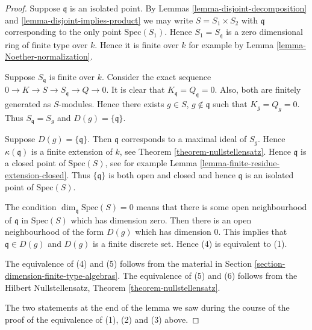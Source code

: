 \begin{proof}
Suppose $\mathfrak q$ is an isolated point.
By Lemmas \ref{lemma-disjoint-decomposition} and
\ref{lemma-disjoint-implies-product} we may
write $S = S_1 \times S_2$ with $\mathfrak q$
corresponding to the only point $\text{Spec}(S_1)$.
Hence $S_1 = S_{\mathfrak q}$ is a zero dimensional
ring of finite type over $k$. Hence it is finite over $k$
for example by Lemma \ref{lemma-Noether-normalization}.

\medskip\noindent
Suppose $S_{\mathfrak q}$ is finite over $k$.
Consider the exact sequence $0 \to K \to S \to S_{\mathfrak q}
\to Q \to 0$. It is clear that $K_{\mathfrak q} = Q_{\mathfrak q} = 0$.
Also, both are finitely generated as $S$-modules. Hence there
exists $g \in S$, $g \not \in \mathfrak q$ such that
$K_g = Q_g = 0$. Thus $S_{\mathfrak q} = S_g$ and
$D(g) = \{ \mathfrak q \}$.

\medskip\noindent
Suppose $D(g) =  \{ \mathfrak q \}$.
Then $\mathfrak q$ corresponds to a maximal ideal
of $S_g$. Hence $\kappa(\mathfrak q)$ is a finite
extension of $k$, see Theorem \ref{theorem-nullstellensatz}.
Hence $\mathfrak q$ is a closed point of $\text{Spec}(S)$,
see for example Lemma \ref{lemma-finite-residue-extension-closed}.
Thus $\{ \mathfrak q \}$ is both open and closed and
hence $\mathfrak q$ is an isolated point of
$\text{Spec}(S)$.

\medskip\noindent
The condition $\dim_{\mathfrak q} \text{Spec}(S) = 0$ means that
there is some open neighbourhood of $\mathfrak q$ in $\text{Spec}(S)$
which has dimension zero. Then there is an open neighbourhood of the
form $D(g)$ which has dimension $0$. This implies that $\mathfrak q \in D(g)$
and $D(g)$ is a finite discrete set. Hence (4) is equivalent to (1).

\medskip\noindent
The equivalence of (4) and (5) follows from the material in
Section \ref{section-dimension-finite-type-algebras}. The equivalence
of (5) and (6) follows from the Hilbert Nullstellensatz,
Theorem \ref{theorem-nullstellensatz}.

\medskip\noindent
The two statements at the end of the lemma we saw during the
course of the proof of the equivalence of (1), (2) and (3) above.
\end{proof}

